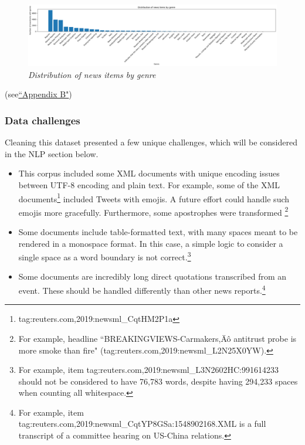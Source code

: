 \documentclass[11pt]{article}
\begin{document}
\begin{itemize}
{    \begin{figure}
      \centerline{\includegraphics[scale=0.3]{distribution_news_item_genre}}
      \caption{\textit{Distribution of news items by genre}}
    \end{figure}

    }
  \end{itemize}
  (see\hyperref[sec:AppendixB]{``Appendix B"})
  
  \subsubsection{Data challenges}
  Cleaning this dataset presented a few unique challenges, which will be considered in the NLP section below.
  \begin{itemize}
    \item{This corpus included some XML documents with unique encoding issues between UTF-8 encoding and plain text. For example, some of the XML documents\footnote{tag:reuters.com,2019:newsml\_CqtHM2P1a} included Tweets with emojis. A future effort could handle such emojis more gracefully. Furthermore, some apostrophes were transformed \footnote{For example, headline ``BREAKINGVIEWS-Carmakers,\"A\^o antitrust probe is more smoke than fire" (tag:reuters.com,2019:newsml\_L2N25X0YW).}
    }
    \item{Some documents include table-formatted text, with many spaces meant to be rendered in a monospace format. In this case, a simple logic to consider a single space as a word boundary is not correct.\footnote{For example, item tag:reuters.com,2019:newsml\_L3N2602HC:991614233 should not be considered to have 76,783 words, despite having 294,233 spaces when counting all whitespace.}}
    \item{Some documents are incredibly long direct quotations transcribed from an event. These should be handled differently than other news reports.\footnote{For example, item tag:reuters.com,2019:newsml\_CqtYP8GSa:1548902168.XML is a full transcript of a committee hearing on US-China relations.}}
  \end{itemize}
\end{document}

